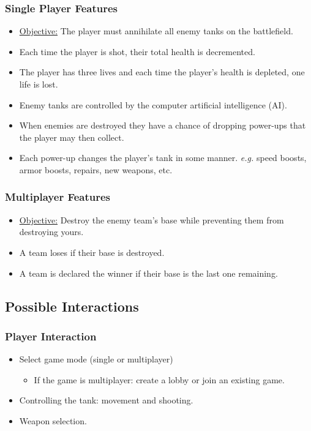 \documentclass[letterpaper,11pt,twoside]{article}
\begin{document}
\subsubsection{Single Player Features}
\begin{itemize}
 \item \underline{Objective:} The player must annihilate all enemy tanks on the battlefield.
 \item Each time the player is shot, their total health is decremented.
 \item The player has three lives and each time the player's health is depleted, one life is lost.
 \item Enemy tanks are controlled by the computer artificial intelligence (AI).
 \item When enemies are destroyed they have a chance of dropping power-ups that the player may then collect.
 \item Each power-up changes the player's tank in some manner. \emph{e.g.} speed boosts, armor boosts, repairs, new weapons, etc.
\end{itemize}

\subsubsection{Multiplayer Features}
\begin{itemize}
 \item \underline{Objective:} Destroy the enemy team's base while preventing them from destroying yours.
 \item A team loses if their base is destroyed.
 \item A team is declared the winner if their base is the last one remaining.
\end{itemize}

\subsection{Possible Interactions}

\subsubsection{Player Interaction}
\begin{itemize}
 \item Select game mode (single or multiplayer)
	\begin{itemize}
		\item If the game is multiplayer: create a lobby or join an existing game.
	\end{itemize}
 \item Controlling the tank: movement and shooting.
 \item Weapon selection.
\end{itemize}
\end{document}

